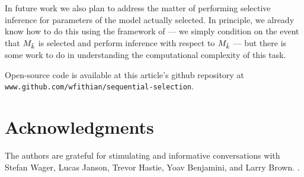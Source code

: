 \documentclass{article}
\begin{document}
In future work we also plan to address the matter of performing selective inference for parameters of the model actually selected. In principle, we already know how to do this using the framework of \citet{fithian2014optimal} --- we simply condition on the event that $M_{\hat{k}}$ is selected and perform inference with respect to $M_{\hat{k}}$ --- but there is some work to do in understanding the computational complexity of this task.

Open-source code is available at this article's github repository at \texttt{www.github.com/wfithian/sequential-selection}.

\section*{Acknowledgments}

The authors are grateful for stimulating and informative conversations with Stefan Wager, Lucas Janson, Trevor Hastie, Yoav Benjamini, and Larry Brown. .



\end{document}
